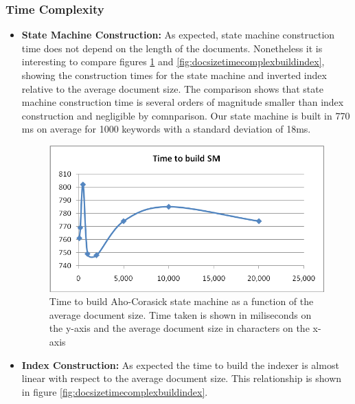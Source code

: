 \documentclass[10pt]{report}
\begin{document}
\subsubsection{Time Complexity}
\begin{itemize}
\item \textbf{State Machine Construction:} 
  As expected, state machine construction time
  does not depend on the length of the documents. Nonetheless it is
  interesting to compare figures \ref{fig:docsizetimecomplexbuildsm}
  and \ref{fig:docsizetimecomplexbuildindex}, showing the construction
  times for the state machine and inverted index relative to the
  average document size. The comparison shows that state machine
  construction time is several orders of magnitude smaller than index
  construction and negligible by comnparison. Our state machine is
  built in 770 ms on average for 1000 keywords with a standard
  deviation of 18ms. 

  \begin{figure}
    \begin{center}
      \includegraphics[width=\textwidth,height=!]{docsizetimecomplexbuildsm}
    \end{center}
    \caption{Time to build Aho-Corasick state machine as a function of
      the average document size. Time taken is shown in miliseconds on the
      y-axis and the average document size in characters on the x-axis}
    \label{fig:docsizetimecomplexbuildsm}
  \end{figure} 

\item \textbf{Index Construction:} 
  As expected the time to build the indexer is almost linear with
  respect to the average document size. This relationship is shown in
  figure \ref{fig:docsizetimecomplexbuildindex}.


\end{itemize}
\end{document}
